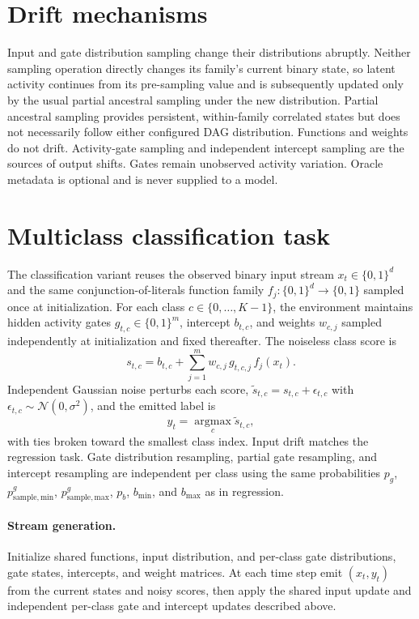 \documentclass[11pt]{article}
\begin{document}
\section{Drift mechanisms}
Input and gate distribution sampling change their distributions abruptly.
Neither sampling operation directly changes its family's current binary state,
so latent activity continues from its pre-sampling value and is subsequently
updated only by the usual partial ancestral sampling under the new
distribution.  Partial ancestral sampling provides persistent,
within-family correlated states but does not necessarily follow either
configured DAG distribution.  Functions and weights do not drift.
Activity-gate sampling and independent intercept sampling are the sources of output
shifts.
Gates remain unobserved activity variation.  Oracle metadata is optional and
is never supplied to a model.

\section{Multiclass classification task}
The classification variant reuses the observed binary input stream
$x_t\in\{0,1\}^d$ and the same conjunction-of-literals function family
$f_j:\{0,1\}^d\to\{0,1\}$ sampled once at initialization.  For each class
$c\in\{0,\ldots,K-1\}$, the environment maintains hidden activity gates
$g_{t,c}\in\{0,1\}^m$, intercept $b_{t,c}$, and weights $w_{c,j}$ sampled
independently at initialization and fixed thereafter.  The noiseless class
score is
\[
s_{t,c}=b_{t,c}+\sum_{j=1}^{m}w_{c,j}\,g_{t,c,j}\,f_j(x_t).
\]
Independent Gaussian noise perturbs each score,
$\tilde s_{t,c}=s_{t,c}+\epsilon_{t,c}$ with
$\epsilon_{t,c}\sim\mathcal N(0,\sigma^2)$, and the emitted label is
\[
y_t=\operatorname*{argmax}_{c}\tilde s_{t,c},
\]
with ties broken toward the smallest class index.  Input drift matches the
regression task.  Gate distribution resampling, partial gate resampling, and
intercept resampling are independent per class using the same probabilities
$p_g$, $p_{\mathrm{sample,min}}^g$, $p_{\mathrm{sample,max}}^g$, $p_b$,
$b_{\min}$, and $b_{\max}$ as in regression.

\paragraph{Stream generation.}
Initialize shared functions, input distribution, and per-class gate
distributions, gate states, intercepts, and weight matrices.  At each time
step emit $(x_t,y_t)$ from the current states and noisy scores, then apply the
shared input update and independent per-class gate and intercept updates
described above.
\end{document}
